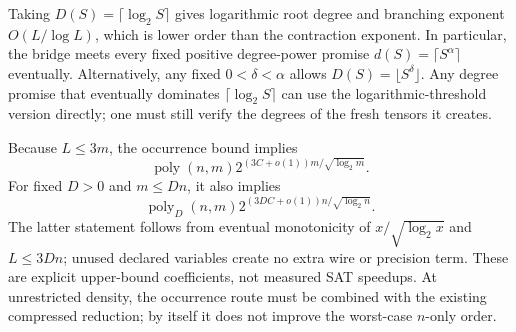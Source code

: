 Taking $D(S)=\lceil\log_2 S\rceil$ gives logarithmic root degree and
branching exponent $O(L/\log L)$, which is lower order than the
contraction exponent. In particular, the bridge meets every fixed
positive degree-power promise $d(S)=\lceil S^\alpha\rceil$ eventually.
Alternatively, any fixed $0<\delta<\alpha$ allows
$D(S)=\lfloor S^\delta\rfloor$. Any degree promise that eventually dominates
$\lceil\log_2 S\rceil$ can use the logarithmic-threshold version directly;
one must still verify the degrees of the fresh tensors it creates.

Because $L\le3m$, the occurrence bound implies
\[
 \operatorname{poly}(n,m)
 2^{(3C+o(1))m/\sqrt{\log_2 m}}.
\]
For fixed $D>0$ and $m\le Dn$, it also implies
\[
 \operatorname{poly}_D(n,m)
 2^{(3DC+o(1))n/\sqrt{\log_2 n}}.
\]
The latter statement follows from eventual monotonicity of
$x/\sqrt{\log_2 x}$ and $L\le3Dn$; unused declared variables create
no extra wire or precision term. These are explicit upper-bound
coefficients, not measured SAT speedups. At unrestricted density,
the occurrence route must be combined with the existing compressed
reduction; by itself it does not improve the worst-case $n$-only order.

